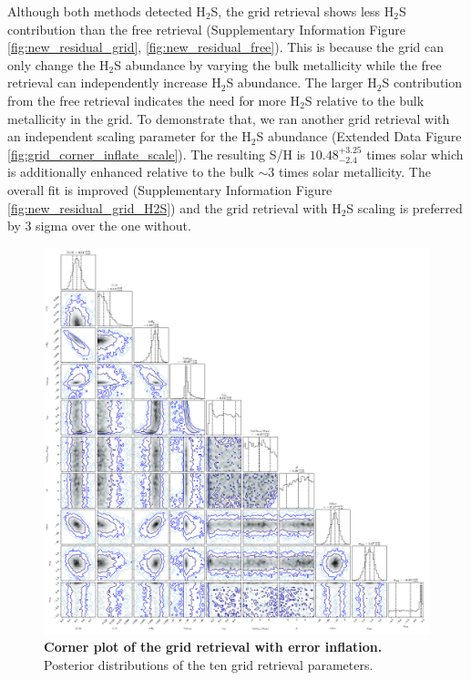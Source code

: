 \documentclass[sn-standardnature]{sn-jnl}%
\begin{document}
Although both methods detected H$_2$S, the grid retrieval shows less H$_2$S contribution than the free retrieval (Supplementary Information Figure \ref{fig:new_residual_grid}, \ref{fig:new_residual_free}). This is because the grid can only change the H$_2$S abundance by varying the bulk metallicity while the free retrieval can independently increase H$_2$S abundance. The larger H$_2$S contribution from the free retrieval indicates the need for more H$_2$S relative to the bulk metallicity in the grid. To demonstrate that, we ran another grid retrieval with an independent scaling parameter for the H$_2$S abundance (Extended Data Figure \ref{fig:grid_corner_inflate_scale}). The resulting S/H is $10.48^{+3.25}_{-2.4}$ times solar which is additionally enhanced relative to the bulk $\sim3$ times solar metallicity. The overall fit is improved (Supplementary Information Figure \ref{fig:new_residual_grid_H2S}) and the grid retrieval with H$_2$S scaling is preferred by 3 sigma over the one without. 


\begin{figure}
\centering
\includegraphics[width=\textwidth,keepaspectratio]{figs/ED_Fig8.pdf}
  \caption{\textbf{Corner plot of the grid retrieval with error inflation.} Posterior distributions of the ten grid retrieval parameters.}
  \label{fig:grid_corner_inflate}
\end{figure}
\end{document}
